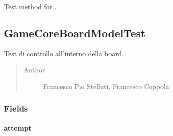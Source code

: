 \documentclass[letterpaper,10pt,italian,openany,oneside]{sphinxmanual}
\begin{document}
\begin{fulllineitems}
\label{\detokenize{test/it/unicam/cs/pa/mastermind/test/GameCoreBoardControllerTest:it.unicam.cs.pa.mastermind.test.GameCoreBoardControllerTest.testInsertNewAttempt()}}
Test method for .

\end{fulllineitems}



\subsection{GameCoreBoardModelTest}
\label{\detokenize{test/it/unicam/cs/pa/mastermind/test/GameCoreBoardModelTest:gamecoreboardmodeltest}}\label{\detokenize{test/it/unicam/cs/pa/mastermind/test/GameCoreBoardModelTest::doc}}

\begin{fulllineitems}
\label{\detokenize{test/it/unicam/cs/pa/mastermind/test/GameCoreBoardModelTest:it.unicam.cs.pa.mastermind.test.GameCoreBoardModelTest}}
Test di controllo all’interno della board.
\begin{quote}\begin{description}
\item[{Author}] \leavevmode
Francesco Pio Stelluti, Francesco Coppola

\end{description}\end{quote}

\end{fulllineitems}



\subsubsection{Fields}
\label{\detokenize{test/it/unicam/cs/pa/mastermind/test/GameCoreBoardModelTest:fields}}

\paragraph{attempt}
\label{\detokenize{test/it/unicam/cs/pa/mastermind/test/GameCoreBoardModelTest:attempt}}
\end{document}

